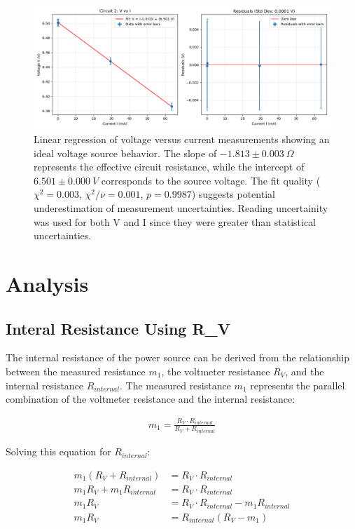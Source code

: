 \documentclass{article} %
\begin{document}
\begin{figure}[htbp]
  \centering
  \includegraphics[width=1\linewidth]{Figs/Circuit_2.png}
    \caption{Linear regression of voltage versus current measurements showing an ideal voltage source behavior. 
                The slope of $-1.813 \pm 0.003~\Omega$ represents the effective circuit resistance, while the intercept of $6.501 \pm 0.000~V$ corresponds to the source voltage. 
                The fit quality ($\chi^2 = 0.003$, $\chi^2/\nu = 0.001$, $p = 0.9987$) suggests potential underestimation of measurement uncertainties.
                Reading uncertainity was used for both V and I since they were greater than statistical uncertainties.}
    \label{fig:circuit_2_fit}
\end{figure}

\section{Analysis}

\subsection{Interal Resistance Using R\_V}

The internal resistance of the power source can be derived from the relationship between the measured resistance $m_1$, the voltmeter resistance $R_V$, and the internal resistance $R_{internal}$. 
The measured resistance $m_1$ represents the parallel combination of the voltmeter resistance and the internal resistance:

\begin{align*}
m_1 = \frac{R_V \cdot R_{internal}}{R_V + R_{internal}}
\end{align*}

Solving this equation for $R_{internal}$:

\begin{align*}
m_1 (R_V + R_{internal}) &= R_V \cdot R_{internal} \\
m_1 R_V + m_1 R_{internal} &= R_V \cdot R_{internal} \\
m_1 R_V &= R_V \cdot R_{internal} - m_1 R_{internal} \\
m_1 R_V &= R_{internal} (R_V - m_1)
\end{align*}
\end{document}

